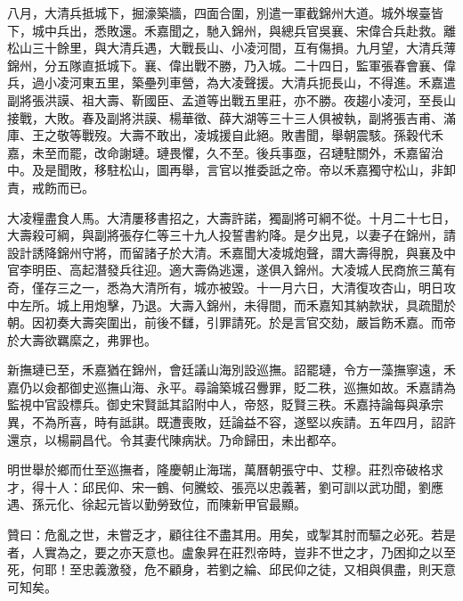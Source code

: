 \begin{pinyinscope}
八月，大清兵抵城下，掘濠築牆，四面合圍，別遣一軍截錦州大道。城外堠臺皆下，城中兵出，悉敗還。禾嘉聞之，馳入錦州，與總兵官吳襄、宋偉合兵赴救。離松山三十餘里，與大清兵遇，大戰長山、小凌河間，互有傷損。九月望，大清兵薄錦州，分五隊直抵城下。襄、偉出戰不勝，乃入城。二十四日，監軍張春會襄、偉兵，過小凌河東五里，築壘列車營，為大凌聲援。大清兵扼長山，不得進。禾嘉遣副將張洪謨、祖大壽、靳國臣、孟道等出戰五里莊，亦不勝。夜趨小凌河，至長山接戰，大敗。春及副將洪謨、楊華徵、薛大湖等三十三人俱被執，副將張吉甫、滿庫、王之敬等戰歿。大壽不敢出，凌城援自此絕。敗書聞，舉朝震駭。孫穀代禾嘉，未至而罷，改命謝璉。璉畏懼，久不至。後兵事亟，召璉駐關外，禾嘉留治中。及是聞敗，移駐松山，圖再舉，言官以推委詆之帝。帝以禾嘉獨守松山，非卸責，戒飭而已。

大凌糧盡食人馬。大清屢移書招之，大壽許諾，獨副將可綱不從。十月二十七日，大壽殺可綱，與副將張存仁等三十九人投誓書約降。是夕出見，以妻子在錦州，請設計誘降錦州守將，而留諸子於大清。禾嘉聞大凌城炮聲，謂大壽得脫，與襄及中官李明臣、高起潛發兵往迎。適大壽偽逃還，遂俱入錦州。大凌城人民商旅三萬有奇，僅存三之一，悉為大清所有，城亦被毀。十一月六日，大清復攻杏山，明日攻中左所。城上用炮擊，乃退。大壽入錦州，未得間，而禾嘉知其納款狀，具疏聞於朝。因初奏大壽突圍出，前後不讎，引罪請死。於是言官交劾，嚴旨飭禾嘉。而帝於大壽欲羈縻之，弗罪也。

新撫璉已至，禾嘉猶在錦州，會廷議山海別設巡撫。詔罷璉，令方一藻撫寧遠，禾嘉仍以僉都御史巡撫山海、永平。尋論築城召釁罪，貶二秩，巡撫如故。禾嘉請為監視中官設標兵。御史宋賢詆其諂附中人，帝怒，貶賢三秩。禾嘉持論每與承宗異，不為所喜，時有詆諆。既遭喪敗，廷論益不容，遂堅以疾請。五年四月，詔許還京，以楊嗣昌代。令其妻代陳病狀。乃命歸田，未出都卒。

明世舉於鄉而仕至巡撫者，隆慶朝止海瑞，萬曆朝張守中、艾穆。莊烈帝破格求才，得十人：邱民仰、宋一鶴、何騰蛟、張亮以忠義著，劉可訓以武功聞，劉應遇、孫元化、徐起元皆以勤勞致位，而陳新甲官最顯。

贊曰：危亂之世，未嘗乏才，顧往往不盡其用。用矣，或掣其肘而驅之必死。若是者，人實為之，要之亦天意也。盧象昇在莊烈帝時，豈非不世之才，乃困抑之以至死，何耶！至忠義激發，危不顧身，若劉之綸、邱民仰之徒，又相與俱盡，則天意可知矣。


\end{pinyinscope}
